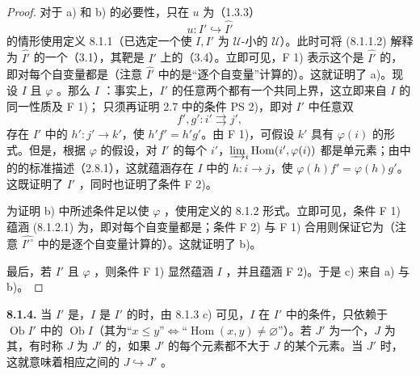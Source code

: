 \begin{proof}
对于 a) 和 b) 的必要性，只在 $u$ 为（1.3.3）
\[
u:I'\hookrightarrow\widehat{I'}
\]
的情形使用定义 8.1.1（已选定一个使 $I,I'$ 为 $\mathcal U$-小的 $\mathcal U$）。此时可将 (8.1.1.2) 解释为 $\widehat{I'}$ 的一个（3.1），其靶是 $I'$ 上的（3.4）。立即可见，F 1) 表示这个是 $\widehat{I'}$ 的，即对每个自变量都是（注意 $\widehat{I'}$ 中的是“逐个自变量”计算的）。这就证明了 a)。现设 $I$ 且 $\varphi$ 。那么 $I$ ：事实上，$I'$ 的任意两个都有一个共同上界，这立即来自 $I$ 的同一性质及 F 1)；
只须再证明 2.7 中的条件 PS 2)，即对 $I'$ 中任意双
\[
f',g':i'\rightrightarrows j',
\]
存在 $I'$ 中的 $h':j'\to k'$，使 $h'f'=h'g'$。由 F 1)，可假设 $k'$ 具有 $\varphi(i)$ 的形式。但是，根据 $\varphi$ 的假设，对 $I'$ 的每个 $i'$，$\varinjlim_i\operatorname{Hom}(i',\varphi(i))$ 都是单元素；由中的的标准描述（2.8.1），这就蕴涵存在 $I$ 中的 $h:i\to j$，使 $\varphi(h)f'=\varphi(h)g'$。这既证明了 $I'$ ，同时也证明了条件 F 2)。

为证明 b) 中所述条件足以使 $\varphi$ ，使用定义的 8.1.2 形式。立即可见，条件 F 1) 蕴涵 (8.1.2.1) 为，即对每个自变量都是；条件 F 2) 与 F 1) 合用则保证它为（注意 $\widehat{I'^\circ}$ 中的是逐个自变量计算的）。这就证明了 b)。

最后，若 $I'$ 且 $\varphi$ ，则条件 F 1) 显然蕴涵 $I$ ，并且蕴涵 F 2)。于是 c) 来自 a) 与 b)。
\end{proof}
\textbf{8.1.4.} 当 $I'$ 是，$I$ 是 $I'$ 的时，由 8.1.3 c) 可见，$I$ 在 $I'$ 中的条件，只依赖于 $\operatorname{Ob}I'$ 中的 $\operatorname{Ob}I$（其为“$x\leq y$”$\Leftrightarrow$“$\operatorname{Hom}(x,y)\ne\varnothing$”）。若 $J'$ 为一个，$J$ 为其，有时称 $J$ 为 $J'$ 的，如果 $J'$ 的每个元素都不大于 $J$ 的某个元素。当 $J'$ 时，这就意味着相应之间的 $J\hookrightarrow J'$ 。

